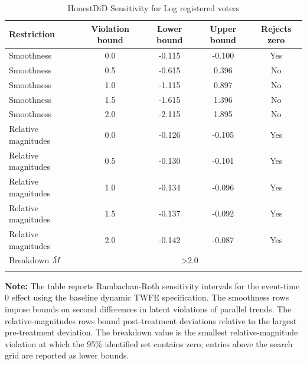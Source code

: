 \begin{table}[htbp]
    \caption{HonestDiD Sensitivity for Log registered voters}
    \label{tab:honestdid-log_num_voters}
    \centering
    \small
    \renewcommand{\arraystretch}{1.08}
    \begin{tabular*}{0.94\textwidth}{@{\extracolsep{\fill}}lcccc}
        \doubletoprule
        Restriction & Violation bound & Lower bound & Upper bound & Rejects zero \\
        \midrule
        Smoothness & 0.0 & -0.115 & -0.100 & Yes \\
        Smoothness & 0.5 & -0.615 & 0.396 & No \\
        Smoothness & 1.0 & -1.115 & 0.897 & No \\
        Smoothness & 1.5 & -1.615 & 1.396 & No \\
        Smoothness & 2.0 & -2.115 & 1.895 & No \\
        \midrule
        Relative magnitudes & 0.0 & -0.126 & -0.105 & Yes \\
        Relative magnitudes & 0.5 & -0.130 & -0.101 & Yes \\
        Relative magnitudes & 1.0 & -0.134 & -0.096 & Yes \\
        Relative magnitudes & 1.5 & -0.137 & -0.092 & Yes \\
        Relative magnitudes & 2.0 & -0.142 & -0.087 & Yes \\
        \midrule
        Breakdown $\bar{M}$ & \multicolumn{4}{c}{>2.0} \\
        \doublebottomrule
    \end{tabular*}
    \vspace{1.0em}
    \begin{minipage}{0.94\textwidth}
        {\footnotesize \textbf{Note:} The table reports Rambachan-Roth sensitivity intervals for the event-time $0$ effect using the baseline dynamic TWFE specification. The smoothness rows impose bounds on second differences in latent violations of parallel trends. The relative-magnitudes rows bound post-treatment deviations relative to the largest pre-treatment deviation. The breakdown value is the smallest relative-magnitude violation at which the 95\% identified set contains zero; entries above the search grid are reported as lower bounds. \par}
    \end{minipage}
\end{table}
